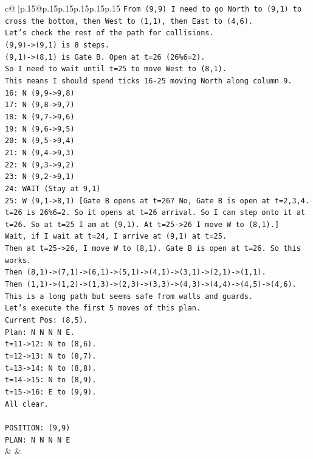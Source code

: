 \documentclass{article}
\begin{document}
{\begin{supertabular}{c@{$\;$}|p{.15\linewidth}@{}p{.15\linewidth}p{.15\linewidth}p{.15\linewidth}p{.15\linewidth}p{.15\linewidth}}
{{{\texttt{From (9,9) I need to go North to (9,1) to cross the bottom, then West to (1,1), then East to (4,6).} \\
\texttt{Let's check the rest of the path for collisions.} \\
\texttt{(9,9){-}>(9,1) is 8 steps.} \\
\texttt{(9,1){-}>(8,1) is Gate B. Open at t=26 (26\%6=2).} \\
\texttt{So I need to wait until t=25 to move West to (8,1).} \\
\texttt{This means I should spend ticks 16{-}25 moving North along column 9.} \\
\texttt{16: N (9,9{-}>9,8)} \\
\texttt{17: N (9,8{-}>9,7)} \\
\texttt{18: N (9,7{-}>9,6)} \\
\texttt{19: N (9,6{-}>9,5)} \\
\texttt{20: N (9,5{-}>9,4)} \\
\texttt{21: N (9,4{-}>9,3)} \\
\texttt{22: N (9,3{-}>9,2)} \\
\texttt{23: N (9,2{-}>9,1)} \\
\texttt{24: WAIT (Stay at 9,1)} \\
\texttt{25: W (9,1{-}>8,1) {[}Gate B opens at t=26? No, Gate B is open at t=2,3,4. t=26 is 26\%6=2. So it opens at t=26 arrival. So I can step onto it at t=26. So at t=25 I am at (9,1). At t=25{-}>26 I move W to (8,1).{]}} \\
\texttt{Wait, if I wait at t=24, I arrive at (9,1) at t=25.} \\
\texttt{Then at t=25{-}>26, I move W to (8,1). Gate B is open at t=26. So this works.} \\
\texttt{Then (8,1){-}>(7,1){-}>(6,1){-}>(5,1){-}>(4,1){-}>(3,1){-}>(2,1){-}>(1,1).} \\
\texttt{Then (1,1){-}>(1,2){-}>(1,3){-}>(2,3){-}>(3,3){-}>(4,3){-}>(4,4){-}>(4,5){-}>(4,6).} \\
\texttt{This is a long path but seems safe from walls and guards.} \\
\texttt{Let's execute the first 5 moves of this plan.} \\
\texttt{Current Pos: (8,5).} \\
\texttt{Plan: N N N N E.} \\
\texttt{t=11{-}>12: N to (8,6).} \\
\texttt{t=12{-}>13: N to (8,7).} \\
\texttt{t=13{-}>14: N to (8,8).} \\
\texttt{t=14{-}>15: N to (8,9).} \\
\texttt{t=15{-}>16: E to (9,9).} \\
\texttt{All clear.} \\
\\ 
\texttt{POSITION: (9,9)} \\
\texttt{PLAN: N N N N E} \\
            }
        }
    }
    & & \\ \\


\end{supertabular}}
\end{document}
